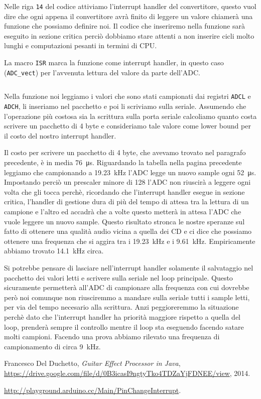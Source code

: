 \documentclass[a4paper,11pt]{article}
\newcommand\source[2]{
	\inputminted[fontsize=\footnotesize,linenos=true,tabsize=4]{#1}{#2}
}
\begin{document}
Nelle riga \texttt{14} del codice attiviamo l'interrupt handler del convertitore, questo vuol dire che ogni appena il convertitore avrà finito di leggere un valore chiamerà una funzione che possiamo definire noi. Il codice che inseriremo nella funzione sarà eseguito in sezione critica perciò dobbiamo stare attenti a non inserire cicli molto lunghi e computazioni pesanti in termini di CPU.

La macro \texttt{ISR} marca la funzione come interrupt handler, in questo caso (\texttt{ADC\_vect}) per l'avvenuta lettura del valore da parte dell'ADC.

\source{cpp}{adc_interrupt_rel}

Nella funzione noi leggiamo i valori che sono stati campionati dai registri \texttt{ADCL} e \texttt{ADCH}, li inseriamo nel pacchetto e poi li scriviamo sulla seriale. Assumendo che l'operazione più costosa sia la scrittura sulla porta seriale calcoliamo quanto costa scrivere un pacchetto di 4 byte e consideriamo tale valore come lower bound per il costo del nostro interrupt handler.

Il costo per scrivere un pacchetto di 4 byte, che avevamo trovato nel paragrafo precedente, è in media \SI{76}{\micro\second}. Riguardando la tabella nella pagina precedente leggiamo che campionando a \SI{19.23}{\kilo\hertz} l'ADC legge un nuovo sample ogni \SI{52}{\micro\second}. Impostando perciò un prescaler minore di 128 l'ADC non riuscirà a leggere ogni volta che gli tocca perchè, ricordando che l'interrupt handler esegue in sezione critica, l'handler di gestione dura di più del tempo di attesa tra la lettura di un campione e l'altro ed accadrà che a volte questo metterà in attesa l'ADC che vuole leggere un nuovo sample.
Questo risultato stronca le nostre speranze sul fatto di ottenere una qualità audio vicina a quella dei CD e ci dice che possiamo ottenere una frequenza che si aggira tra i \SI{19.23}{\kilo\hertz} e i \SI{9.61}{\kilo\hertz}. Empiricamente abbiamo trovato \SI{14.1}{\kilo\hertz} circa.

\vspace{0.2in}
Si potrebbe pensare di lasciare nell'interrupt handler solamente il salvataggio nel pacchetto dei valori letti e scrivere sulla seriale nel loop principale. Questo sicuramente permetterà all'ADC di campionare alla frequenza con cui dovrebbe però noi comunque non riusciremmo a mandare sulla seriale tutti i sample letti, per via del tempo necesario alla scrittura. Anzi peggioreremmo la situazione perchè dato che l'interrupt handler ha priorità maggiore rispetto a quella del loop, prenderà sempre il controllo mentre il loop sta eseguendo facendo satare molti campioni. Facendo una prova abbiamo rilevato una frequenza di campionamento di circa \SI{9}{\kilo\hertz}.

\begin{thebibliography}{9}

  Francesco Del Duchetto,
  \emph{Guitar Effect Processor in Java},
  \url{https://drive.google.com/file/d/0B3icasI9ngtyTko4TDZaYjFDNEE/view},
  2014.

	\url{http://playground.arduino.cc/Main/PinChangeInterrupt}.

\end{thebibliography}
\end{document}
